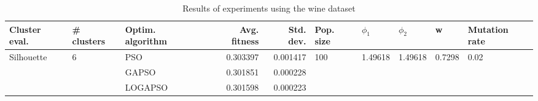 \begin{table}
\centering
\caption{Results of experiments using the wine dataset}
\begin{tabular}{lllrrlllll}
\toprule
              Cluster eval. &        \# clusters & Optim. algorithm &  Avg. fitness &  Std. dev. &            Pop. size &               $\phi_{1}$ &               $\phi_{2}$ &                       w &         Mutation rate \\
\midrule
\multirow{3}{*}{Silhouette} & \multirow{3}{*}{6} &              PSO &      0.303397 &   0.001417 & \multirow{3}{*}{100} & \multirow{3}{*}{1.49618} & \multirow{3}{*}{1.49618} & \multirow{3}{*}{0.7298} & \multirow{3}{*}{0.02} \\
                            &                    &            GAPSO &      0.301851 &   0.000228 &                      &                          &                          &                         &                       \\
                            &                    &          LOGAPSO &      0.301598 &   0.000223 &                      &                          &                          &                         &                       \\
\bottomrule
\end{tabular}
\end{table}
